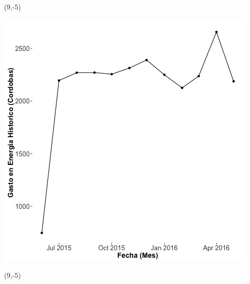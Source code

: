 \documentclass{article}\usepackage[]{graphicx}\usepackage[]{color}
\newenvironment{knitrout}{}{} %
\begin{document}
 \begin{textblock}{1}(9,-5)
\begin{minipage}{20em}
\begingroup

\endgroup
\end{minipage}
\end{textblock}

\begin{knitrout}
\color{fgcolor}
\includegraphics[scale=0.65]{figure/A28_historico_cordobas} 
\end{knitrout}

 \begin{textblock}{1}(9,-5)
\begin{minipage}{20em}
\begingroup

\endgroup
\end{minipage}
\end{textblock}
\end{document}
